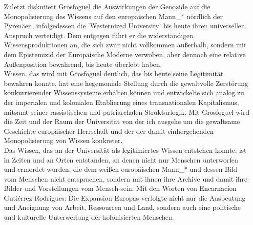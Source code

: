\noindent Zuletzt diskutiert Grosfoguel die Auswirkungen der Genozide auf die
Monopolisierung des Wissens auf den europäischen Mann\_* nördlich der Pyrenäen,
infolgedessen die 'Westernized University' bis heute ihren universellen
Anspruch verteidigt. Dem entgegen führt er die widerständigen
Wissensproduktionen an, die sich zwar nicht vollkommen außerhalb, sondern mit
dem Epistemizid der Europäische Moderne verwoben, aber dennoch eine relative
Außenposition bewahrend, bis heute überlebt haben.\footnotemark {}\\

\noindent Wissen, das wird mit Grosfoguel deutlich, das bis heute seine Legitimität
bewahren konnte, hat eine hegemoniale Stellung durch die gewaltvolle Zerstörung
konkurrierender Wissenssysteme erhalten können und entwickelte sich analog zu
der imperialen und kolonialen Etablierung eines transnationalen Kapitalismus,
mitsamt seiner rassistischen und patriarchalen Strukturlogik. 
Mit Grosfoguel wird die Zeit und der Raum der Universität von der ich ausgehe um die
gewaltsame Geschichte europäischer Herrschaft und der der damit einhergehenden
Monopolisierung von Wissen konkreter.\\

\noindent Das Wissen, das an der Universität als legitimiertes Wissen entstehen konnte,
ist in Zeiten und an Orten entstanden, an denen nicht nur Menschen unterworfen
und ermordet wurden, die dem weißen europäischen Mann\_* und dessen Bild vom
Menschen nicht entsprachen, sondern mit ihnen ihre Archive und damit ihre
Bilder und Vorstellungen vom Mensch-sein. Mit den Worten von Encarnacíon
Gutiérrez Rodrigues: \glqq Die Expansion Europas verfolgte nicht nur die Ausbeutung
und Aneignung von Arbeit, Ressourcen und Land, sondern auch eine politische und
kulturelle Unterwerfung der kolonisierten Menschen.\grqq \footnotemark
{}
